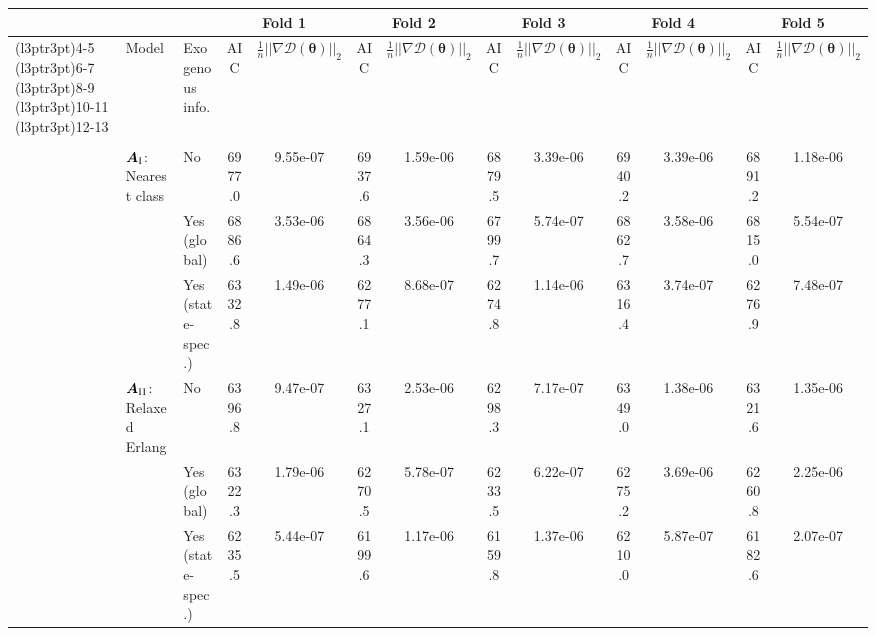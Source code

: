 
\begin{threeparttable}
\begin{tabular}[t]{>{}lllcccccccccc}
\toprule
\multicolumn{3}{c}{ } & \multicolumn{2}{c}{Fold 1} & \multicolumn{2}{c}{Fold 2} & \multicolumn{2}{c}{Fold 3} & \multicolumn{2}{c}{Fold 4} & \multicolumn{2}{c}{Fold 5} \\
\cmidrule(l{3pt}r{3pt}){4-5} \cmidrule(l{3pt}r{3pt}){6-7} \cmidrule(l{3pt}r{3pt}){8-9} \cmidrule(l{3pt}r{3pt}){10-11} \cmidrule(l{3pt}r{3pt}){12-13}
 & Model & Exogenous info. & AIC & $\frac{1}{n}||\nabla \mathcal{D} (\bm \theta)||_2$ & AIC & $\frac{1}{n}||\nabla \mathcal{D} (\bm \theta)||_2$ & AIC & $\frac{1}{n}||\nabla \mathcal{D} (\bm \theta)||_2$ & AIC & $\frac{1}{n}||\nabla \mathcal{D} (\bm \theta)||_2$ & AIC & $\frac{1}{n}||\nabla \mathcal{D} (\bm \theta)||_2$\\
\midrule
\addlinespace[0.3em]
\multicolumn{13}{l}{\textbf{\textbf{Markov jump process}}}\\
\hspace{1em} & $\bm{A}_{\RN{1}}$: Nearest class & No & 6977.0 & 9.55e-07 & 6937.6 & 1.59e-06 & 6879.5 & 3.39e-06 & 6940.2 & 3.39e-06 & 6891.2 & 1.18e-06\\

\hspace{1em} &  & Yes (global) & 6886.6 & 3.53e-06 & 6864.3 & 3.56e-06 & 6799.7 & 5.74e-07 & 6862.7 & 3.58e-06 & 6815.0 & 5.54e-07\\

\hspace{1em} &  & Yes (state-spec.) & 6332.8 & 1.49e-06 & 6277.1 & 8.68e-07 & 6274.8 & 1.14e-06 & 6316.4 & 3.74e-07 & 6276.9 & 7.48e-07\\

\addlinespace[0.5em]

\hspace{1em} & $\bm{A}_{\RN{2}}$: Relaxed Erlang & No & 6396.8 & 9.47e-07 & 6327.1 & 2.53e-06 & 6298.3 & 7.17e-07 & 6349.0 & 1.38e-06 & 6321.6 & 1.35e-06\\

\hspace{1em} &  & Yes (global) & 6322.3 & 1.79e-06 & 6270.5 & 5.78e-07 & 6233.5 & 6.22e-07 & 6275.2 & 3.69e-06 & 6260.8 & 2.25e-06\\

\hspace{1em} &  & Yes (state-spec.) & 6235.5 & 5.44e-07 & 6199.6 & 1.17e-06 & 6159.8 & 1.37e-06 & 6210.0 & 5.87e-07 & 6182.6 & 2.07e-07\\


\end{tabular}
\end{threeparttable}
